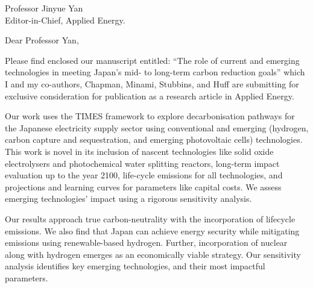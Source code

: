 \documentclass[10pt]{letter} %
\begin{document}
{}


\begin{letter}{Professor Jinyue Yan\\
Editor-in-Chief, Applied Energy.}


\address{Anshuman Chaube\\
achaube2@illinois.edu\\
226 Talbot Laboratory\\
MC-234\\
104 S. Wright Street\\
Urbana, IL 61801}



\opening{Dear Professor Yan,}

Please find enclosed our manuscript entitled: ``The role of current and emerging technologies in meeting Japan's mid- to long-term carbon reduction goals'' which I and my co-authors, Chapman, Minami, Stubbins, and Huff 
are submitting for exclusive consideration for publication as a research 
article in Applied Energy.

Our work uses the TIMES framework to explore decarbonisation pathways for the Japanese electricity supply sector using conventional and emerging (hydrogen, carbon capture and sequestration, and emerging photovoltaic cells) technologies. This work is novel in its inclusion of nascent technologies like solid oxide electrolysers and photochemical water splitting reactors, long-term impact evaluation up to the year 2100, life-cycle emissions for all technologies, and projections and learning curves for parameters like capital costs. We assess emerging technologies’ impact using a rigorous sensitivity analysis.

Our results approach true carbon-neutrality with the incorporation of lifecycle emissions. We also find that Japan can achieve energy security while mitigating emissions using renewable-based hydrogen. Further, incorporation of nuclear along with hydrogen emerges as an economically viable strategy. Our sensitivity analysis identifies key emerging technologies, and their most impactful parameters. 


\end{letter}
\end{document}
